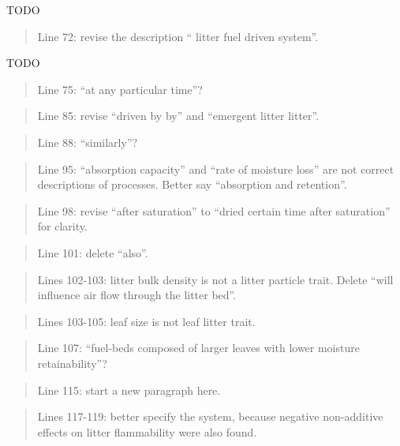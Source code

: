 \documentclass[letterpaper, 12pt]{letter}
\begin{document}
\begin{letter}{}
TODO

\begin{quote}
Line 72: revise the description “ litter fuel driven system”.
\end{quote}

TODO

\begin{quote}
Line 75: “at any particular time”?
\end{quote}

\begin{quote}
Line 85: revise “driven by by” and “emergent litter litter”.
\end{quote}

\begin{quote}
Line 88: “similarly”?
\end{quote}

\begin{quote}
Line 95: “absorption capacity” and “rate of moisture loss” are not correct descriptions of processes. Better say “absorption and retention”.
\end{quote}

\begin{quote}
Line 98: revise “after saturation” to “dried certain time after saturation” for clarity.
\end{quote}

\begin{quote}
Line 101: delete “also”.
\end{quote}

\begin{quote}
Lines 102-103: litter bulk density is not a litter particle trait. Delete “will influence air flow through the litter bed”.
\end{quote}

\begin{quote}
Lines 103-105: leaf size is not leaf litter trait.
\end{quote}

\begin{quote}
Line 107: “fuel-beds composed of larger leaves with lower moisture retainability”?
\end{quote}

\begin{quote}
Line 115: start a new paragraph here.
\end{quote}

\begin{quote}
Lines 117-119: better specify the system, because negative non-additive effects on litter
flammability were also found.
\end{quote}


\end{letter}
\end{document}
